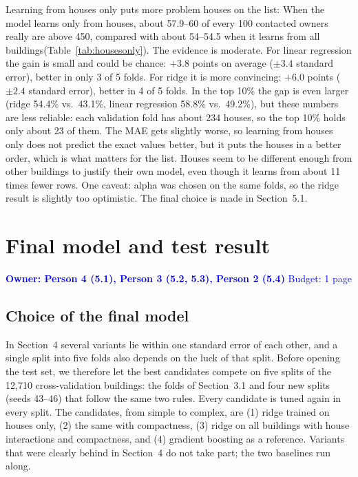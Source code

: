 \documentclass[11pt,a4paper]{article}
\newcommand{\owner}[2]{\noindent\textcolor{blue}{\textbf{Owner: #1} \quad Budget: #2}\par\medskip}
\begin{document}
Learning from houses only puts more problem houses on the list: When the model learns only from houses, about 57.9--60 of every 100 contacted owners really are above 450, compared with about 54--54.5 when it learns from all buildings(Table~\ref{tab:housesonly}). The evidence is moderate. For linear regression the gain is small and could be chance: $+3.8$ points on average ($\pm 3.4$ standard error), better in only 3 of 5 folds. For ridge it is more convincing:
$+6.0$ points ($\pm 2.4$ standard error), better in 4 of 5 folds. In the top 10\% the gap is even larger (ridge 54.4\% vs.\ 43.1\%, linear regression 58.8\% vs.\ 49.2\%), but these numbers are less reliable: each validation fold has about 234 houses, so the top 10\% holds only about 23 of them. The MAE gets slightly worse, so learning from houses only does not predict the exact values better, but it puts the houses in a
better order, which is what matters for the list. Houses seem to be different enough from
other buildings to justify their own model, even though it learns from about 11 times fewer
rows. One caveat: alpha was chosen on the same folds, so the ridge result is slightly too
optimistic. The final choice is made in Section~5.1.

\section{Final model and test result}
\owner{Person 4 (5.1), Person 3 (5.2, 5.3), Person 2 (5.4)}{1 page}

\subsection{Choice of the final model}
In Section~4 several variants lie within one standard error of each other, and a single split into five
folds also depends on the luck of that split. Before opening the test set, we therefore let the best
candidates compete on five splits of the 12,710 cross-validation buildings: the folds of Section~3.1 and
four new splits (seeds 43--46) that follow the same two rules. Every candidate is tuned again in every split.
The candidates, from simple to complex, are (1) ridge trained on houses only, (2) the same with compactness,
(3) ridge on all buildings with house interactions and compactness, and (4) gradient boosting as a reference.
Variants that were clearly behind in Section~4 do not take part; the two baselines run along.
\end{document}
